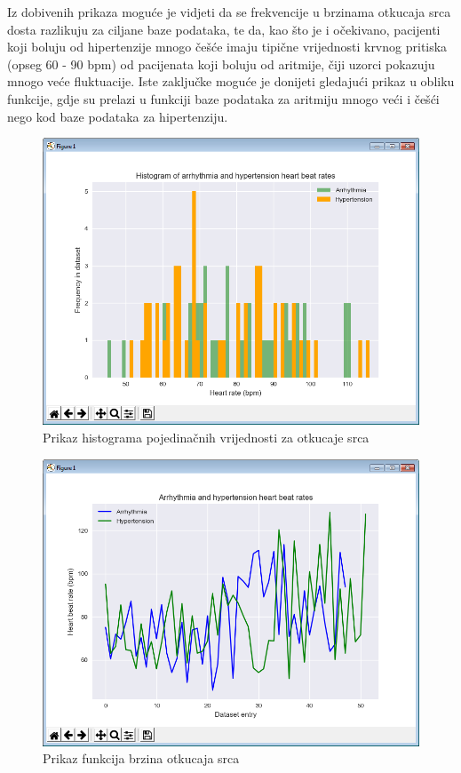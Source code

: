 \documentclass[12pt,a4paper]{article}
\begin{document}
Iz dobivenih prikaza moguće je vidjeti da se frekvencije u brzinama otkucaja srca dosta razlikuju za ciljane baze podataka, te da, kao što je i očekivano, pacijenti koji boluju od hipertenzije mnogo češće imaju tipične vrijednosti krvnog pritiska (opseg 60 - 90 bpm) od pacijenata koji boluju od aritmije, čiji uzorci pokazuju mnogo veće fluktuacije. Iste zaključke moguće je donijeti gledajući prikaz u obliku funkcije, gdje su prelazi u funkciji baze podataka za aritmiju mnogo veći i češći nego kod baze podataka za hipertenziju.

\begin{figure}[H]
\center
\includegraphics[scale=0.55]{../res/plot-heart-rates-histogram.PNG}
\caption{Prikaz histograma pojedinačnih vrijednosti za otkucaje srca}
\label{histogram}
\end{figure}

\begin{figure}[H]
\center
\includegraphics[scale=0.55]{../res/plot-heart-rates.PNG}
\caption{Prikaz funkcija brzina otkucaja srca}
\label{function}
\end{figure}
\end{document}
